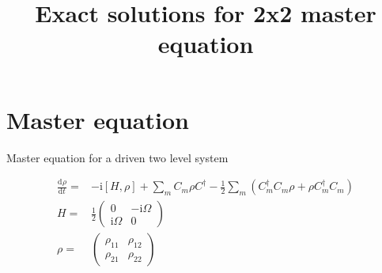 \documentclass[10pt,fleqn]{article}
\title{Exact solutions for 2x2 master equation}
\newcommand{\ud}{\mathrm{d}}
\newcommand{\ui}{\mathrm{i}}
\newcommand{\eqar}[1]
{
  \begin{align*}
    #1
  \end{align*}
}
\newcommand{\paren}[1]{{\left({#1}\right)}}
\newcommand{\sqr}[1]{{\left[{#1}\right]}}
\newcommand{\diff}[3][{}]{{\frac{\ud^{#1} {#2}}{\ud {#3}{}^{#1}}}}
\begin{document}
\maketitle

\section{Master equation}
Master equation for a driven two level system
\eqar{
  \diff{\rho}{t}=&-\ui\sqr{H, \rho}+\sum_m C_m\rho C^\dagger-\frac12\sum_m\paren{C^\dagger_m C_m\rho+\rho C^\dagger_m C_m}\\
  H=&\frac12\begin{pmatrix}
    0&-\ui\Omega\\
    \ui\Omega&0
  \end{pmatrix}\\
  \rho=&\begin{pmatrix}
    \rho_{11}&\rho_{12}\\
    \rho_{21}&\rho_{22}
  \end{pmatrix}\\
}
\end{document}
